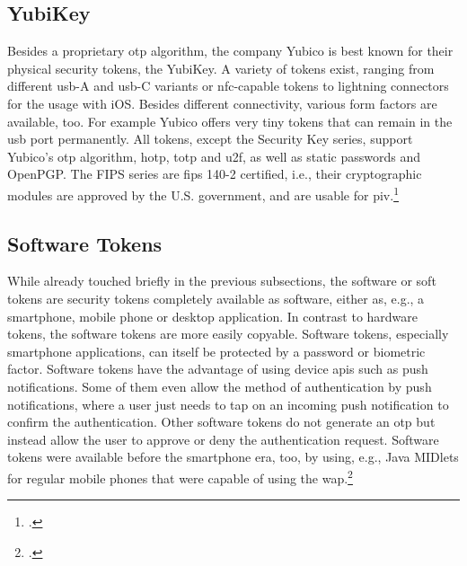 \subsection{YubiKey}

Besides a proprietary \gls{otp} algorithm, the company Yubico is best known for their physical security tokens, the YubiKey. A variety of tokens exist, ranging from different \gls{usb}-A and \gls{usb}-C variants or \gls{nfc}-capable tokens to lightning connectors for the usage with iOS. Besides different connectivity, various form factors are available, too. For example Yubico offers very tiny tokens that can remain in the \gls{usb} port permanently. All tokens, except the \frqq Security Key\flqq{} series, support Yubico's \gls{otp} algorithm, \gls{hotp}, \gls{totp} and \gls{u2f}, as well as static passwords and OpenPGP. The \frqq FIPS series\flqq{} are \gls{fips} 140-2 certified, i.e., their cryptographic modules are approved by the U.S. government, and are usable for \gls{piv}.\footcites[See][716]{HUSEYNOV2017715}[See][83]{Jacobs:2016:STA:2953926.2953927}[See][109]{Jacobs:2019}

\subsection{Software Tokens}

While already touched briefly in the previous subsections, the software or soft tokens are security tokens completely available as software, either as, e.g., a smartphone, mobile phone or desktop application. In contrast to hardware tokens, the software tokens are more easily copyable. Software tokens, especially smartphone applications, can itself be protected by a password or biometric factor. Software tokens have the advantage of using device \glspl{api} such as push notifications. Some of them even allow the method of \frqq authentication by push notifications\flqq, where a user just needs to tap on an incoming push notification to confirm the authentication. Other software tokens do not generate an \gls{otp} but instead allow the user to approve or deny the authentication request. Software tokens were available before the smartphone era, too, by using, e.g., Java MIDlets for regular mobile phones that were capable of using the \gls{wap}.\footcites[See][717]{HUSEYNOV2017715}[See][111]{ELMALIKI201475}[See][60]{Ulqinaku:2019:FPP:3317549.3323404}[See][222--223]{dasgupta2017multi}[See][3]{4300040}
